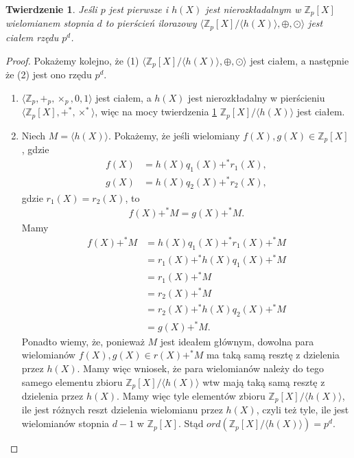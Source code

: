 \documentclass[polish,declaration,shortabstract]{iithesis}
\theoremstyle{definition}
\theoremstyle{remark} \newtheorem{observation}{Obserwacja}
\theoremstyle{plain} \newtheorem{theorem}{Twierdzenie}
\theoremstyle{plain} \newtheorem{lemma}{Lemat}
\theoremstyle{remark} \newtheorem*{remark*}{Uwaga}
\theoremstyle{reminder} \newtheorem*{reminder*}{Przypomnienie}
\begin{document}
\begin{theorem} \label{pier_ilo_cialem}
	Jeśli $p$ jest pierwsze i $h(X)$ jest nierozkładalnym w $\mathbb{Z}_p[X]$ wielomianem stopnia $d$ to pierścień ilorazowy $\langle \mathbb{Z}_p[X]/\langle h(X) \rangle, \oplus, \odot \rangle$ jest ciałem rzędu $p^d$.
\end{theorem}

\begin{proof}
	Pokażemy kolejno, że (1) $\langle \mathbb{Z}_p[X]/\langle h(X) \rangle, \oplus, \odot \rangle$ jest ciałem, a następnie że (2) jest ono rzędu $p^d$.
	\begin{enumerate}[label=(\arabic*),leftmargin=.4in]
		\item $\langle \mathbb{Z}_p, +_p, \times_p, 0, 1 \rangle$ jest ciałem, a $h(X)$ jest nierozkładalny w pierścieniu $\langle \mathbb{Z}_p[X], +^*, \times^* \rangle$, więc na mocy twierdzenia \ref{pier_ilo_cialem} $\mathbb{Z}_p[X]/\langle h(X) \rangle$ jest ciałem.
		\item Niech $M = \langle h(X) \rangle$. Pokażemy, że jeśli wielomiany $f(X), g(X) \in \mathbb{Z}_p[X]$, gdzie 
		      \begin{align*}
		      	f(X) & = h(X)q_1(X) +^* r_1(X), \\
		      	g(X) & = h(X)q_2(X) +^* r_2(X), 
		      \end{align*}
		      gdzie $r_1(X) = r_2(X)$, to 
		      \begin{align*}
		      	f(X) +^* M = g(X) +^* M. 
		      \end{align*}
		      Mamy 
		      \begin{align*}
		      	f(X) +^* M & = h(X)q_1(X) +^* r_1(X) +^* M  \\
		      	           & = r_1(X) +^* h (X)q_1(X) +^* M \\
		      	           & = r_1(X) +^* M                 \\
		      	           & = r_2(X) +^* M                 \\
		      	           & = r_2(X) +^* h(X)q_2(X) +^* M  \\
		      	           & = g(X) +^* M.                  
		      \end{align*}
		      Ponadto wiemy, że, ponieważ $M$ jest ideałem głównym, dowolna para wielomianów $f(X), g(X) \in r(X) +^* M$ ma taką samą resztę z dzielenia przez $h(X)$. Mamy więc wniosek, że para wielomianów należy do tego samego elementu zbioru $\mathbb{Z}_p[X]/\langle h(X) \rangle$ wtw mają taką samą resztę z dzielenia przez $h(X)$.\newline
		      Mamy więc tyle elementów zbioru $\mathbb{Z}_p[X]/\langle h(X) \rangle$, ile jest różnych reszt dzielenia wielomianu przez $h(X)$, czyli też tyle, ile jest wielomianów stopnia $d-1$ w $\mathbb{Z}_p[X]$. Stąd $ord(\mathbb{Z}_p[X]/\langle h(X) \rangle) = p^d$.
	\end{enumerate}
\end{proof}
\end{document}
